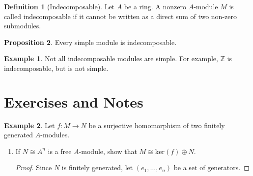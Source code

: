 \documentclass[a4paper]{book}
\theoremstyle{definition}
\newtheorem{definition}{Definition}[]
\newtheorem{example}{Example}[definition]
\newtheorem{proposition}[definition]{Proposition}
\begin{document}
\begin{defbox}
    \begin{definition}[Indecomposable]
        Let \(A\) be a ring. A nonzero \(A\)-module \(M\) is called indecomposable if it cannot be written as a direct sum of two non-zero submodules.
    \end{definition}
\end{defbox}

\begin{thmbox}
    \begin{proposition}
        Every simple module is indecomposable.
    \end{proposition}
\end{thmbox}

\begin{exmbox}
    \begin{example}
        Not all indecomposable modules are simple. For example, \(\mathbb{Z}\) is indecomposable, but is not simple.
    \end{example}
\end{exmbox}

\newpage
\section{Exercises and Notes}

\begin{example}
    Let \(f: M \rightarrow N\) be a surjective homomorphism of two finitely generated \(A\)-modules.

    \begin{enumerate}
        \item If \(N \cong A^n\) is a free \(A\)-module, show that \(M \cong \mathrm{ker}(f) \oplus N\).
        
        \begin{proof}
            Since \(N\) is finitely generated, let \((e_1, \ldots, e_n)\) be a set of generators. 
        \end{proof}
    \end{enumerate}
\end{example}
\end{document}
